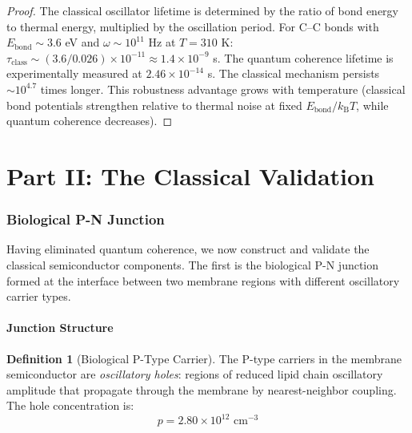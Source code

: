 \documentclass[twocolumn,10pt,a4paper]{article}
\theoremstyle{definition}
\newtheorem{definition}[theorem]{Definition}
\theoremstyle{remark}
\newcommand{\kB}{k_{\mathrm{B}}}
\begin{document}
\begin{proof}
The classical oscillator lifetime is determined by the ratio of bond energy to thermal energy, multiplied by the oscillation period. For C--C bonds with $E_{\mathrm{bond}} \sim 3.6$ eV and $\omega \sim 10^{11}$ Hz at $T = 310$ K: $\tau_{\mathrm{class}} \sim (3.6/0.026) \times 10^{-11} \approx 1.4 \times 10^{-9}$ s. The quantum coherence lifetime is experimentally measured at $2.46 \times 10^{-14}$ s. The classical mechanism persists $\sim 10^{4.7}$ times longer. This robustness advantage grows with temperature (classical bond potentials strengthen relative to thermal noise at fixed $E_{\mathrm{bond}}/\kB T$, while quantum coherence decreases). \qedhere
\end{proof}



\part*{Part II: The Classical Validation}

\section{Biological P-N Junction}
\label{sec:pn_junction}

Having eliminated quantum coherence, we now construct and validate the classical semiconductor components. The first is the biological P-N junction formed at the interface between two membrane regions with different oscillatory carrier types.

\subsection{Junction Structure}

\begin{definition}[Biological P-Type Carrier]
\label{def:ptype}
The P-type carriers in the membrane semiconductor are \emph{oscillatory holes}: regions of reduced lipid chain oscillatory amplitude that propagate through the membrane by nearest-neighbor coupling. The hole concentration is:
\begin{equation}
\label{eq:ptype}
p = 2.80 \times 10^{12} \text{ cm}^{-3}
\end{equation}
\end{definition}
\end{document}
